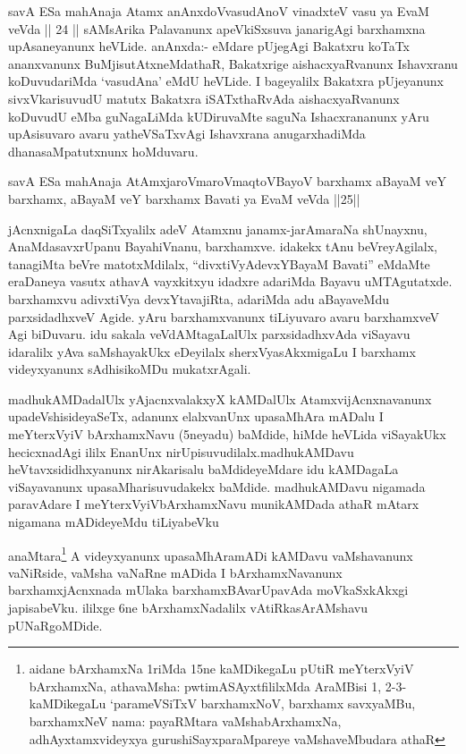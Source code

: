 \begin{artha}
savA ESa mahAnaja Atamx anAnxdoVvasudAnoV vinadxteV vasu ya EvaM veVda || 24 || sAMsArika Palavanunx apeVkiSxsuva janarigAgi barxhamxna upAsaneyanunx heVLide. anAnxda:- eMdare pUjegAgi Bakatxru koTaTx ananxvanunx BuMjisutAtxneMdathaR, Bakatxrige aishacxyaRvanunx Ishavxranu koDuvudariMda `vasudAna' eMdU heVLide. I bageyalilx Bakatxra pUjeyanunx sivxVkarisuvudU matutx Bakatxra iSATxthaRvAda aishacxyaRvanunx koDuvudU eMba guNagaLiMda kUDiruvaMte saguNa Ishacxrananunx yAru upAsisuvaro avaru yatheVSaTxvAgi Ishavxrana anugarxhadiMda dhanasaMpatutxnunx hoMduvaru. 

savA ESa mahAnaja AtAmx\s jaroV\s maroV\s maqtoV\s BayoV barxhamx aBayaM veY barxhamx, aBayaM veY barxhamx Bavati ya EvaM veVda ||25||
\end{artha}


\begin{artha}
jAcnxnigaLa daqSiTxyalilx adeV Atamxnu janamx-jarAmaraNa shUnayxnu, AnaMdasavxrUpanu BayahiVnanu, barxhamxve. idakekx tAnu beVreyAgilalx, tanagiMta beVre matotxMdilalx, ``divxtiVyAdevxYBayaM Bavati''  eMdaMte eraDaneya vasutx athavA vayxkitxyu idadxre adariMda Bayavu uMTAgutatxde. barxhamxvu adivxtiVya devxYtavajiRta, adariMda adu aBayaveMdu parxsidadhxveV Agide. yAru barxhamxvanunx tiLiyuvaro avaru barxhamxveV Agi biDuvaru. idu sakala veVdAMtagaLalUlx parxsidadhxvAda viSayavu idaralilx yAva saMshayakUkx eDeyilalx sherxVyasAkxmigaLu I barxhamx videyxyanunx sAdhisikoMDu mukatxrAgali.
\end{artha}



\begin{artha}
madhukAMDadalUlx yAjacnxvalakxyX kAMDalUlx AtamxvijAcnxnavanunx upadeVshisideyaSeTx, adanunx elalxvanUnx upasaMhAra mADalu I meYterxVyiV bArxhamxNavu (5neyadu) baMdide, hiMde heVLida viSayakUkx hecicxnadAgi ililx EnanUnx nirUpisuvudilalx.\break madhukAMDavu heVtavxsididhxyanunx nirAkarisalu baMdideyeMdare idu kAMDagaLa viSayavanunx upasaMharisuvudakekx baMdide. madhukAMDa\-vu nigamada paravAdare I meYterxVyiVbArxhamxNavu munikAMDada athaR mAtarx nigamana mADideyeMdu tiLiyabeVku
\end{artha}

\begin{artha}
anaMtara\footnote{aidane bArxhamxNa 1riMda 15ne kaMDikegaLu pUtiR meYterxVyiV bArxhamxNa, athavaMsha: pwtimASAyxtf\ndash  ililxMda AraMBisi 1, 2-3- kaMDikegaLu `parameVSiTxV barxhamxNoV, barxhamx savxyaMBu, barxhamxNeV nama: payaRMtara vaMshabArxhamxNa, adhAyxtamxvideyxya gurushiSayxparaMpareye vaMshaveMbudara athaR} A videyxyanunx upasaMhAramADi kAMDavu vaMshavanunx vaNiRside, vaMsha vaNaRne mADida I bArxhamxNavanunx barxhamxjAcnxnada mUlaka barxhamxBAvarUpavAda moVkaSxkAkxgi japisabeVku. ililxge 6ne bArxhamxNadalilx vAtiRkasArAMshavu pUNaRgoMDide.
\end{artha}

